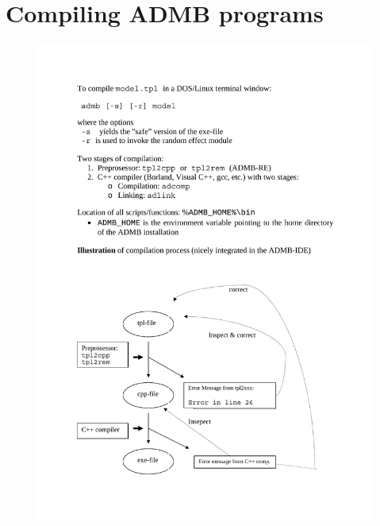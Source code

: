 \documentclass[12pt,letter,reqno]{book}
\begin{document}
\section{Compiling ADMB programs}
\vskip-1.5cm
\begin{figure}[H]
\includegraphics[scale=0.6]{compiling.pdf}
\label{fig:compiling}
\end{figure}

\nopagebreak
\end{document}

